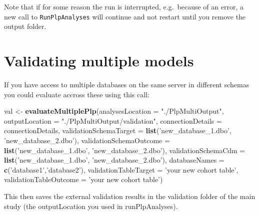\documentclass[]{article}
\newenvironment{Shaded}{\begin{snugshade}}{\end{snugshade}}
\newcommand{\KeywordTok}[1]{\textcolor[rgb]{0.13,0.29,0.53}{\textbf{#1}}}
\newcommand{\DataTypeTok}[1]{\textcolor[rgb]{0.13,0.29,0.53}{#1}}
\newcommand{\StringTok}[1]{\textcolor[rgb]{0.31,0.60,0.02}{#1}}
\newcommand{\NormalTok}[1]{#1}
\begin{document}
Note that if for some reason the run is interrupted, e.g.~because of an
error, a new call to \texttt{RunPlpAnalyses} will continue and not
restart until you remove the output folder.

\section{Validating multiple models}\label{validating-multiple-models}

If you have access to multiple databases on the same server in different
schemas you could evaluate accross these using this call:

\begin{Shaded}
\begin{Highlighting}[]
\NormalTok{val <-}\StringTok{ }\KeywordTok{evaluateMultiplePlp}\NormalTok{(}\DataTypeTok{analysesLocation =} \StringTok{"./PlpMultiOutput"}\NormalTok{,}
                           \DataTypeTok{outputLocation =} \StringTok{"./PlpMultiOutput/validation"}\NormalTok{,}
                           \DataTypeTok{connectionDetails =}\NormalTok{ connectionDetails, }
                           \DataTypeTok{validationSchemaTarget =} \KeywordTok{list}\NormalTok{(}\StringTok{'new_database_1.dbo'}\NormalTok{,}
                                                              \StringTok{'new_database_2.dbo'}\NormalTok{),}
                           \DataTypeTok{validationSchemaOutcome =} \KeywordTok{list}\NormalTok{(}\StringTok{'new_database_1.dbo'}\NormalTok{,}
                                                              \StringTok{'new_database_2.dbo'}\NormalTok{),}
                           \DataTypeTok{validationSchemaCdm =} \KeywordTok{list}\NormalTok{(}\StringTok{'new_database_1.dbo'}\NormalTok{,}
                                                              \StringTok{'new_database_2.dbo'}\NormalTok{), }
                           \DataTypeTok{databaseNames =} \KeywordTok{c}\NormalTok{(}\StringTok{'database1'}\NormalTok{,}\StringTok{'database2'}\NormalTok{),}
                           \DataTypeTok{validationTableTarget =} \StringTok{'your new cohort table'}\NormalTok{,}
                           \DataTypeTok{validationTableOutcome =} \StringTok{'your new cohort table'}\NormalTok{)}
\end{Highlighting}
\end{Shaded}

This then saves the external validation results in the validation folder
of the main study (the outputLocation you used in runPlpAnalyses).
\end{document}
